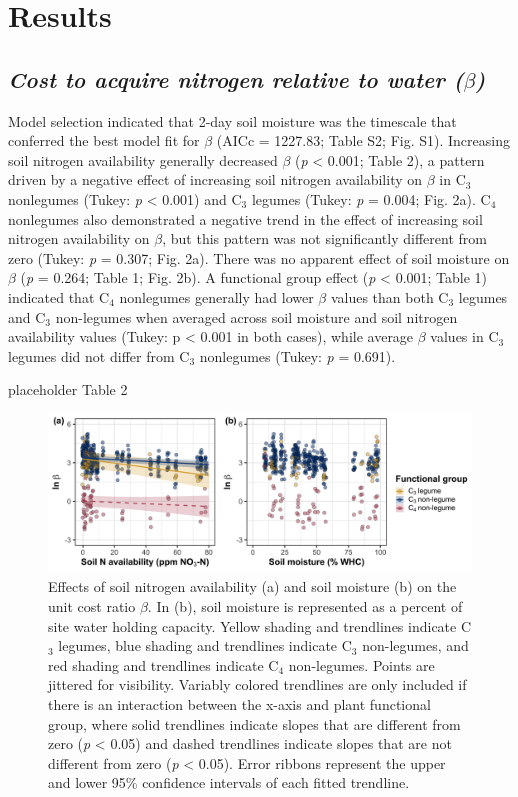 \section{Results}
\subsection{\textit{Cost to acquire nitrogen relative to water ($\beta$)}}
Model selection indicated that 2-day soil moisture was the timescale that conferred the best model fit for $\beta$ (AICc = 1227.83; Table S2; Fig. S1). Increasing soil nitrogen availability generally decreased $\beta$ (\textit{p} < 0.001; Table 2), a pattern driven by a negative effect of increasing soil nitrogen availability on $\beta$ in C$_3$ nonlegumes (Tukey: \textit{p} < 0.001) and C$_3$ legumes (Tukey: \textit{p} = 0.004; Fig. 2a). C$_4$ nonlegumes also demonstrated a negative trend in the effect of increasing soil nitrogen availability on $\beta$, but this pattern was not significantly different from zero (Tukey: \textit{p} = 0.307; Fig. 2a). There was no apparent effect of soil moisture on $\beta$ (\textit{p} = 0.264; Table 1; Fig. 2b). A functional group effect (\textit{p} < 0.001; Table 1) indicated that C$_4$ nonlegumes generally had lower $\beta$ values than both C$_3$ legumes and C$_3$ non-legumes when averaged across soil moisture and soil nitrogen availability values (Tukey: p < 0.001 in both cases), while average $\beta$ values in C$_3$ legumes did not differ from C$_3$ nonlegumes (Tukey: \textit{p} = 0.691).

\newpage
placeholder Table 2
\clearpage

\newpage
\begin{figure}
    \centering
    \includegraphics[scale = 0.06]{ch4_TXeco/figs/TXeco_fig2_beta.png}
    \caption[Effects of soil nitrogen availability and soil moisture on the unit cost ratio $\beta$]{Effects of soil nitrogen availability (a) and soil moisture (b) on the unit cost ratio $\beta$. In (b), soil moisture is represented as a percent of site water holding capacity. Yellow shading and trendlines indicate C$_3$ legumes, blue shading and trendlines indicate C$_3$ non-legumes, and red shading and trendlines indicate C$_4$ non-legumes. Points are jittered for visibility. Variably colored trendlines are only included if there is an interaction between the x-axis and plant functional group, where solid trendlines indicate slopes that are different from zero (\textit{p} < 0.05) and dashed trendlines indicate slopes that are not different from zero (\textit{p} < 0.05). Error ribbons represent the upper and lower 95\% confidence intervals of each fitted trendline.}
    \label{fig:figure4.2}
\end{figure}
\clearpage


